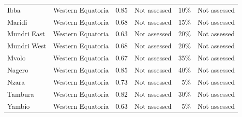 \begin{longtable}{llrrrl}
Ibba & Western Equatoria & 0.85 & Not assessed & 10\% & Not assessed \\
Maridi & Western Equatoria & 0.68 & Not assessed & 15\% & Not assessed \\
Mundri East & Western Equatoria & 0.63 & Not assessed & 20\% & Not assessed \\
Mundri West & Western Equatoria & 0.68 & Not assessed & 20\% & Not assessed \\
Mvolo & Western Equatoria & 0.67 & Not assessed & 35\% & Not assessed \\
Nagero & Western Equatoria & 0.85 & Not assessed & 40\% & Not assessed \\
Nzara & Western Equatoria & 0.73 & Not assessed & 5\% & Not assessed \\
Tambura & Western Equatoria & 0.82 & Not assessed & 30\% & Not assessed \\
Yambio & Western Equatoria & 0.63 & Not assessed & 5\% & Not assessed \\
\end{longtable}
